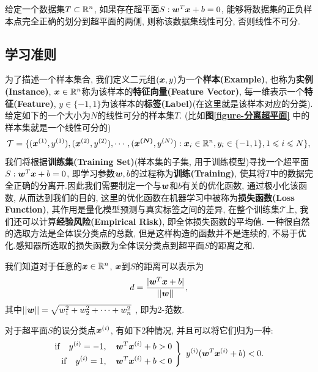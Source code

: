 \documentclass[12pt, a4paper, oneside]{ctexart}
\begin{document}
\begin{definition}[线性可分性]
    给定一个数据集$T\subset \mathbb{R}^n$, 如果存在超平面$S: \boldsymbol{w}^T\boldsymbol{x} + b = 0$, 能够将数据集的正负样本点完全正确的划分到超平面的两侧, 则称该数据集线性可分, 否则线性不可分.
\end{definition}
\subsection{学习准则}
为了描述一个样本集合, 我们定义二元组$(\boldsymbol{x},  y)$为一个\textbf{样本(Example)}, 也称为\textbf{实例(Instance)}, $\boldsymbol{x}\in\mathbb{R}^n$称为该样本的\textbf{特征向量(Feature Vector)}, 每一维表示一个\textbf{特征(Feature)}, $y\in\{-1, 1\}$为该样本的\textbf{标签(Label)}(在这里就是该样本对应的分类).给定如下的一个大小为$N$的线性可分的样本集$T$. (比如\textbf{图\ref{figure-分离超平面}} 中的样本集就是一个线性可分的)
\begin{equation}
    \mathcal{T} = \{(\boldsymbol{x}^{(1)}, y^{(1)}), (\boldsymbol{x}^{(2)}, y^{(2)}), \cdots, (\boldsymbol{x^{(N)}}, y^{(N)}):\boldsymbol{x}_i\in\mathbb{R}^n, y_i\in\{-1, 1\}, 1\leqslant i\leqslant N\},
\end{equation}
我们将根据\textbf{训练集(Training Set)}(样本集的子集, 用于训练模型)寻找一个超平面$S: \boldsymbol{w}^T\boldsymbol{x}+b=0$, 即学习参数$\boldsymbol{w}, b$的过程称为\textbf{训练(Training)}, 使其将$T$中的数据完全正确的分离开.因此我们需要制定一个与$\boldsymbol{w}$和$b$有关的优化函数, 通过极小化该函数, 从而达到我们的目的, 这里的优化函数在机器学习中被称为\textbf{损失函数(Loss Function)}, 其作用是量化模型预测与真实标签之间的差异, 在整个训练集$\mathcal{T}$上, 我们还可以计算\textbf{经验风险(Empirical Risk)}, 即全体损失函数的平均值. 一种很自然的选取方法是全体误分类点的总数, 但是这样构造的函数并不是连续的, 不易于优化.感知器所选取的损失函数为全体误分类点到超平面$S$的距离之和.

我们知道对于任意的$\boldsymbol{x}\in \mathbb{R}^n$, $\boldsymbol{x}$到$S$的距离可以表示为
\begin{equation}
    d = \frac{|\boldsymbol{w}^T\boldsymbol{x}+b|}{||\boldsymbol{w}||},
\end{equation}
其中$||\boldsymbol{w}||=\sqrt{w_1^2+w_2^2+\cdots+w_n^2}$ , 即为2-范数.

对于超平面$S$的误分类点$\boldsymbol{x}^{(i)}$, 有如下2种情况, 并且可以将它们归为一种: 
\begin{equation}
    \left.\begin{aligned}
    \mathrm{if}\quad y^{(i)}=-1, \quad \bd{w}^T\bd{x}^{(i)}+b > 0\ \\
    \mathrm{if}\quad y^{(i)}=1, \quad \bd{w}^T\bd{x}^{(i)}+b<0\ 
    \end{aligned}\right\}\ 
    y^{(i)}(\bd{w}^T\bd{x}^{(i)}+b)<0.
\end{equation}
\end{document}
